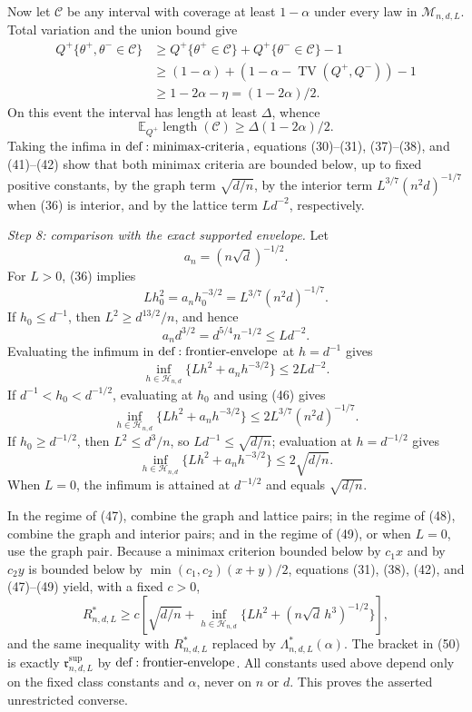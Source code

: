 Now let \(\mathcal C\) be any interval with coverage at least \(1-\alpha\) under every law in \(\mathcal M_{n,d,L}\).  Total variation and the union bound give
\[
 \begin{aligned}
 Q^+\{\theta^+,\theta^-\in\mathcal C\}
 &\geq Q^+\{\theta^+\in\mathcal C\}
      +Q^+\{\theta^-\in\mathcal C\}-1\\
 &\geq(1-\alpha)+(1-\alpha-\operatorname{TV}(Q^+,Q^-))-1\\
 &\geq 1-2\alpha-\eta=(1-2\alpha)/2.
\end{aligned}
\tag{44}
\]
On this event the interval has length at least \(\Delta\), whence
\[
 \mathbb E_{Q^+}\operatorname{length}(\mathcal C)
 \geq\Delta(1-2\alpha)/2.
\tag{45}
\]
Taking the infima in \({\rm def:minimax\text{-}criteria}\), equations (30)--(31), (37)--(38), and (41)--(42) show that both minimax criteria are bounded below, up to fixed positive constants, by the graph term \(\sqrt{d/n}\), by the interior term \(L^{3/7}(n^2d)^{-1/7}\) when (36) is interior, and by the lattice term \(Ld^{-2}\), respectively.

\textit{Step 8: comparison with the exact supported envelope.}
Let
\[
 a_n=(n\sqrt d)^{-1/2}.
\]
For \(L>0\), (36) implies
\[
 Lh_0^2=a_nh_0^{-3/2}=L^{3/7}(n^2d)^{-1/7}.
\tag{46}
\]
If \(h_0\leq d^{-1}\), then \(L^2\geq d^{13/2}/n\), and hence
\[
 a_nd^{3/2}=d^{5/4}n^{-1/2}\leq Ld^{-2}.
\]
Evaluating the infimum in \({\rm def:frontier\text{-}envelope}\) at \(h=d^{-1}\) gives
\[
 \inf_{h\in\mathcal H_{n,d}}\{Lh^2+a_nh^{-3/2}\}
 \leq2Ld^{-2}.
\tag{47}
\]
If \(d^{-1}<h_0<d^{-1/2}\), evaluating at \(h_0\) and using (46) gives
\[
 \inf_{h\in\mathcal H_{n,d}}\{Lh^2+a_nh^{-3/2}\}
 \leq2L^{3/7}(n^2d)^{-1/7}.
\tag{48}
\]
If \(h_0\geq d^{-1/2}\), then \(L^2\leq d^3/n\), so \(Ld^{-1}\leq\sqrt{d/n}\); evaluation at \(h=d^{-1/2}\) gives
\[
 \inf_{h\in\mathcal H_{n,d}}\{Lh^2+a_nh^{-3/2}\}
 \leq2\sqrt{d/n}.
\tag{49}
\]
When \(L=0\), the infimum is attained at \(d^{-1/2}\) and equals \(\sqrt{d/n}\).

In the regime of (47), combine the graph and lattice pairs; in the regime of (48), combine the graph and interior pairs; and in the regime of (49), or when \(L=0\), use the graph pair.  Because a minimax criterion bounded below by \(c_1x\) and by \(c_2y\) is bounded below by \(\min(c_1,c_2)(x+y)/2\), equations (31), (38), (42), and (47)--(49) yield, with a fixed \(c>0\),
\[
 R^*_{n,d,L}\geq c\left[\sqrt{d/n}+
 \inf_{h\in\mathcal H_{n,d}}\{Lh^2+(n\sqrt d\,h^3)^{-1/2}\}\right],
\tag{50}
\]
and the same inequality with \(R^*_{n,d,L}\) replaced by \(\Lambda^*_{n,d,L}(\alpha)\).  The bracket in (50) is exactly \(\mathfrak r^{\mathrm{sup}}_{n,d,L}\) by \({\rm def:frontier\text{-}envelope}\).  All constants used above depend only on the fixed class constants and \(\alpha\), never on \(n\) or \(d\).  This proves the asserted unrestricted converse.